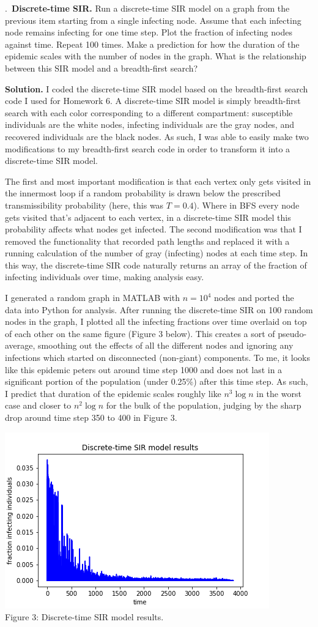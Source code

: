 \documentclass{letter}
\newcounter{problem}
\newcommand{\Problem}[2]{%
	\stepcounter{problem}%
	\leftskip=0pt%
	\theproblem.~\textbf{{#1.}} #2 \par%
}
\newcommand{\Solution}[1]{%
	\textbf{Solution.} #1 \par%
}
\begin{document}
    \Problem{Discrete-time SIR}{Run a discrete-time SIR model on a graph from the previous item starting from a single infecting node. Assume that each infecting node remains infecting for one time step. Plot the fraction of infecting nodes against time. Repeat 100 times. Make a prediction for how the duration of the epidemic scales with the number of nodes in the graph. What is the relationship between this SIR model and a breadth-first search?}
    \Solution{I coded the discrete-time SIR model based on the breadth-first search code I used for Homework 6. A discrete-time SIR model is simply breadth-first search with each color corresponding to a different compartment: susceptible individuals are the white nodes, infecting individuals are the gray nodes, and recovered individuals are the black nodes. As such, I was able to easily make two modifications to my breadth-first search code in order to transform it into a discrete-time SIR model. 
    
    The first and most important modification is that each vertex only gets visited in the innermost loop if a random probability is drawn below the prescribed transmissibility probability (here, this was $T = 0.4$). Where in BFS every node gets visited that's adjacent to each vertex, in a discrete-time SIR model this probability affects what nodes get infected. The second modification was that I removed the functionality that recorded path lengths and replaced it with a running calculation of the number of gray (infecting) nodes at each time step. In this way, the discrete-time SIR code naturally returns an array of the fraction of infecting individuals over time, making analysis easy.

    I generated a random graph in MATLAB with $n = 10^4$ nodes and ported the data into Python for analysis. After running the discrete-time SIR on 100 random nodes in the graph, I plotted all the infecting fractions over time overlaid on top of each other on the same figure (Figure 3 below). This creates a sort of pseudo-average, smoothing out the effects of all the different nodes and ignoring any infections which started on disconnected (non-giant) components. To me, it looks like this epidemic peters out around time step 1000 and does not last in a significant portion of the population (under 0.25\%) after this time step. As such, I predict that duration of the epidemic scales roughly like $n^3 \log n$ in the worst case and closer to $n^2\log n$ for the bulk of the population, judging by the sharp drop around time step 350 to 400 in Figure 3.

    \begin{center}
        \includegraphics{../pics/discSIR.png} \\
        Figure 3: Discrete-time SIR model results. 
    \end{center}}
\end{document}
